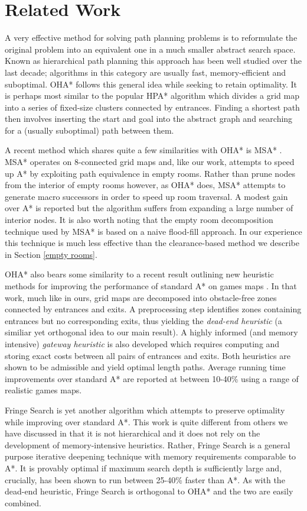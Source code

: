 \section{Related Work}
A very effective method for solving path planning problems is to reformulate the original problem
into an equivalent one in a much smaller abstract search space. 
Known as hierarchical path planning this approach has been well studied over the last decade;
algorithms in this category are usually fast, memory-efficient and suboptimal.
OHA* follows this general idea while seeking to retain optimality.
It is perhaps most similar to the popular HPA* algorithm \cite{botea04} 
which divides a grid map into a series of fixed-size clusters connected 
by entrances.
Finding a shortest path then involves inserting the start and goal into the 
abstract graph and searching for a (usually suboptimal) path between them.
\par
A recent method which shares quite a few similarities with OHA* is MSA* \cite{bolanca09}.
MSA* operates on 8-connected grid maps and, like our work,
 attempts to speed up A* by exploiting path equivalence in empty rooms.
Rather than prune nodes from the interior of empty rooms however, as OHA* does,
MSA* attempts to generate macro successors 
in order to speed up room traversal. 
A modest gain over A* is reported but the algorithm suffers from 
expanding a large number of interior nodes. 
It is also worth noting that the empty room decomposition technique used by 
MSA* is based on a naive flood-fill approach.
In our experience this technique is much less effective than the 
clearance-based method we describe in Section \ref{empty rooms}.
\par
OHA* also bears some similarity to a recent result outlining new heuristic methods for improving the 
performance of standard A* on games maps \cite{bjornsson06}.
In that work, much like in ours, grid maps are decomposed into obstacle-free zones connected by entrances 
and exits. 
A preprocessing step identifies zones containing entrances but no corresponding exits, thus
yielding the \emph{dead-end heuristic} (a similiar yet orthogonal idea to our main result).
A highly informed (and memory intensive) \emph{gateway heuristic} is also developed which 
requires computing and storing exact costs between all pairs of entrances and exits.
Both heuristics are shown to be admissible and yield optimal length paths. 
Average running time improvements over standard A* are reported at between 10-40\% using a range of
realistic games maps.
\par
Fringe Search is yet another algorithm which attempts to preserve optimality
while improving over standard A*.
This work is quite different from others we have discussed in that it is not 
hierarchical and it does not rely on the development of memory-intensive heuristics.
Rather, Fringe Search is a general purpose iterative deepening technique with memory requirements
comparable to A*. 
It is provably optimal if maximum search depth is sufficiently large and, crucially, has been shown to 
run between 25-40\% faster than A*.
As with the dead-end heuristic, Fringe Search is orthogonal to OHA* and the two
are easily combined.
